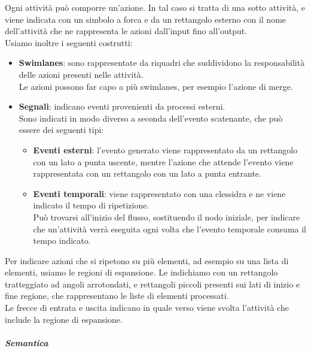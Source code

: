         Ogni attività può comporre un'azione. In tal caso si tratta di una sotto attività, e viene indicata con un simbolo a forca e da un rettangolo esterno con il nome dell'attività che ne rappresenta le azioni dall'input fino all'output.\\
        Usiamo inoltre i seguenti costrutti:
        \begin{itemize}
            \item \textbf{Swimlanes}: sono rappresentate da riquadri che suddividono la responsabilità delle azioni presenti nelle attività.\\
                Le azioni possono far capo a più swimlanes, per esempio l'azione di merge.
            \item \textbf{Segnali}: indicano eventi provenienti da processi esterni.\\
            Sono indicati in modo diverso a seconda dell'evento scatenante, che può essere dei seguenti tipi:
            \begin{itemize}
                \item \textbf{Eventi esterni}: l'evento generato viene rappresentato da un rettangolo con un lato a punta uscente, mentre l'azione che attende l'evento viene rappresentata con un rettangolo con un lato a punta entrante.
                \item \textbf{Eventi temporali}: viene rappresentato con una clessidra e ne viene indicato il tempo di ripetizione.\\
                    Può trovarsi all'inizio del flusso, sostituendo il nodo iniziale, per indicare che un'attività verrà eseguita ogni volta che l'evento temporale consuma il tempo indicato.
            \end{itemize}
        \end{itemize}
        Per indicare azioni che si ripetono su più elementi, ad esempio su una lista di elementi, usiamo le regioni di espansione.
        Le indichiamo con un rettangolo tratteggiato ad angoli arrotondati, e rettangoli piccoli presenti sui lati di inizio e fine regione, che rappresentano le liste di elementi processati.\\
        Le frecce di entrata e uscita indicano in quale verso viene svolta l'attività che include la regione di espansione.

		\subparagraph{Semantica} %


